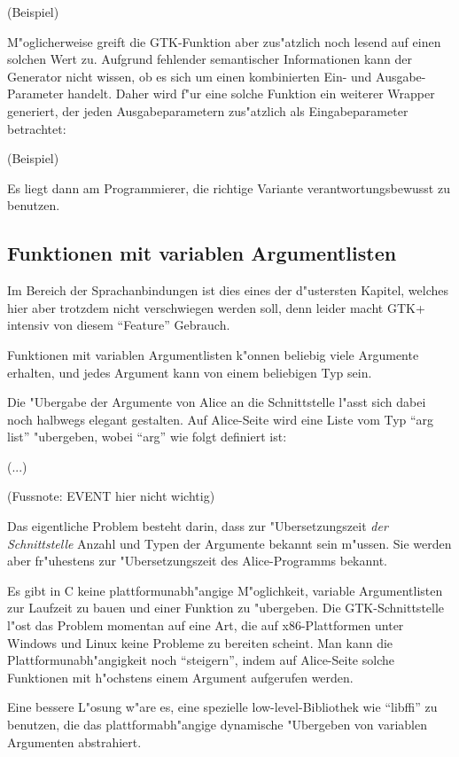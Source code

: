 \documentclass{article}
\begin{document}
(Beispiel)

M"oglicherweise greift die GTK-Funktion aber zus"atzlich noch lesend auf 
einen solchen Wert zu. Aufgrund fehlender semantischer Informationen kann
der Generator nicht wissen, ob es sich um einen kombinierten Ein- und
Ausgabe-Parameter handelt.
Daher wird f"ur eine solche Funktion ein weiterer Wrapper generiert,
der jeden Ausgabeparametern zus"atzlich als Eingabeparameter betrachtet:

(Beispiel)

Es liegt dann am Programmierer, die richtige Variante verantwortungsbewusst
zu benutzen.

\subsection{Funktionen mit variablen Argumentlisten}

Im Bereich der Sprachanbindungen ist dies eines der d"ustersten Kapitel,
welches hier aber trotzdem nicht verschwiegen werden soll, denn leider
macht GTK+ intensiv von diesem ``Feature'' Gebrauch.

Funktionen mit variablen Argumentlisten k"onnen beliebig viele Argumente
erhalten, und jedes Argument kann von einem beliebigen Typ sein.

Die "Ubergabe der Argumente von Alice an die Schnittstelle l"asst sich dabei
noch halbwegs elegant gestalten. Auf Alice-Seite wird eine Liste vom Typ
``arg list'' "ubergeben, wobei ``arg'' wie folgt definiert ist:

(...)

(Fussnote: EVENT hier nicht wichtig)

Das eigentliche Problem besteht darin, dass zur "Ubersetzungszeit
\textit{der Schnittstelle} Anzahl und Typen der Argumente bekannt sein m"ussen.
Sie werden aber fr"uhestens zur "Ubersetzungszeit des
Alice-Programms bekannt.

Es gibt in C keine plattformunabh"angige M"oglichkeit,
variable Argumentlisten zur Laufzeit zu bauen und einer Funktion zu "ubergeben.
Die GTK-Schnittstelle l"ost das Problem momentan auf eine Art, die
auf x86-Plattformen unter Windows und Linux keine Probleme
zu bereiten scheint. Man kann die Plattformunabh"angigkeit noch ``steigern'',
indem auf Alice-Seite solche Funktionen mit h"ochstens einem Argument
aufgerufen werden.

Eine bessere L"osung w"are es, eine spezielle low-level-Bibliothek
wie ``libffi'' zu benutzen, die das plattformabh"angige dynamische "Ubergeben
von variablen Argumenten abstrahiert.
\end{document}
